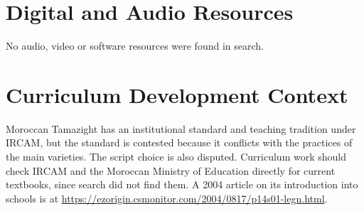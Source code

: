 \documentclass[12pt]{article}
\begin{document}
\section{Digital and Audio Resources}
No audio, video or software resources were found in search.

\section{Curriculum Development Context}
Moroccan Tamazight has an institutional standard and teaching tradition under IRCAM, but the standard is contested because it conflicts with the practices of the main varieties. The script choice is also disputed. Curriculum work should check IRCAM and the Moroccan Ministry of Education directly for current textbooks, since search did not find them. A 2004 article on its introduction into schools is at \url{https://ezorigin.csmonitor.com/2004/0817/p14s01-legn.html}.
\end{document}
